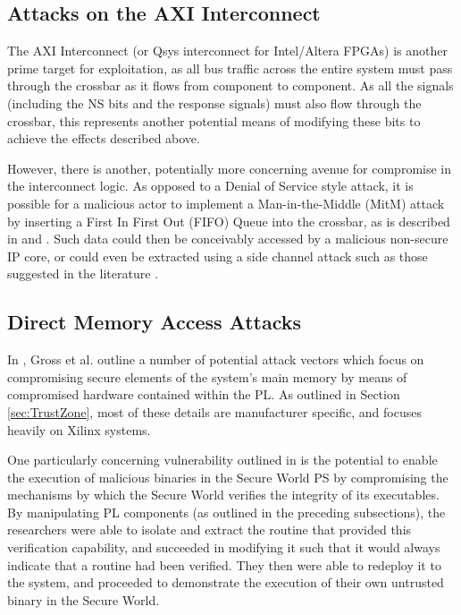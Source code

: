\documentclass[journal]{IEEEtran}
\begin{document}
\subsection{Attacks on the AXI Interconnect} \label{sec:AXI Interconnect Attacks}
The AXI Interconnect (or Qsys interconnect for Intel/Altera FPGAs) is another prime target
for exploitation, as all bus traffic across the entire system must pass through the
crossbar as it flows from component to component. As all the signals (including the NS
bits and the response signals) must also flow through the crossbar, this represents
another potential means of modifying these bits to achieve the effects described above.

However, there is another, potentially more concerning avenue for compromise in the
interconnect logic. As opposed to a Denial of Service style attack, it is possible for a
malicious actor to implement a Man-in-the-Middle (MitM) attack by inserting a First In
First Out (FIFO) Queue into the crossbar, as is described in \cite{benhani_security_2017}
and \cite{benhani_security_2019}. Such data could then be conceivably accessed by a
malicious non-secure IP core, or could even be extracted using a side channel attack such
as those suggested in the literature \cite{bukasa_how_2018}.

\subsection{Direct Memory Access Attacks} \label{sec:DMA Attacks}
In \cite{gross_breaking_2019}, Gross et al. outline a number of potential attack vectors
which focus on compromising secure elements of the system's main memory by means of 
compromised hardware contained within the PL. As outlined in Section \ref{sec:TrustZone}, 
most of these details are manufacturer specific, and \cite{gross_breaking_2019} focuses 
heavily on Xilinx systems.

One particularly concerning vulnerability outlined in \cite{gross_breaking_2019} is the
potential to enable the execution of malicious binaries in the Secure World PS by 
compromising the mechanisms by which the Secure World verifies the integrity of its
executables. By manipulating PL components (as outlined in the preceding subsections),
the researchers were able to isolate and extract the routine that provided this
verification capability, and succeeded in modifying it such that it would always indicate
that a routine had been verified. They then were able to redeploy it to the system, and
proceeded to demonstrate the execution of their own untrusted binary in the Secure World.
\end{document}
